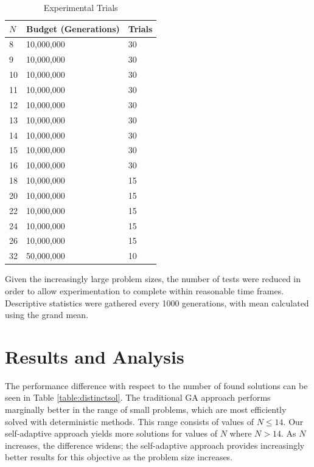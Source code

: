 \documentclass[conference]{IEEEtran}
\begin{document}
\begin{table}
\centering
\caption{Experimental Trials}
\begin{tabular}{|l|l|l|} \hline
$N$&        Budget (Generations)&     Trials \\ \hline
8&          10,000,000&         30 \\ \hline
9&          10,000,000&         30 \\ \hline
10&         10,000,000&         30 \\ \hline
11&         10,000,000&         30 \\ \hline
12&         10,000,000&         30 \\ \hline
13&         10,000,000&         30 \\ \hline
14&         10,000,000&         30 \\ \hline
15&         10,000,000&         30 \\ \hline
16&         10,000,000&         30 \\ \hline
18&         10,000,000&         15 \\ \hline
20&         10,000,000&         15 \\ \hline
22&         10,000,000&         15 \\ \hline
24&         10,000,000&         15 \\ \hline
26&         10,000,000&         15 \\ \hline
32&         50,000,000&         10 \\ \hline
\end{tabular}
\label{table:trials}
\end{table}

Given the increasingly large problem sizes, the number of tests were reduced in order to allow experimentation to complete within reasonable time frames. Descriptive statistics were gathered every 1000 generations, with mean calculated using the grand mean.

\section{Results and Analysis}
The performance difference with respect to the number of found solutions can be seen in Table \ref{table:distinctsol}. The traditional GA approach performs marginally better in the range of small problems, which are most efficiently solved with deterministic methods. This range consists of values of $N \leq 14$. Our self-adaptive approach yields more solutions for values of $N$ where $N > 14$. As $N$ increases, the difference widens; the self-adaptive approach provides increasingly better results for this objective as the problem size increases.
\end{document}
